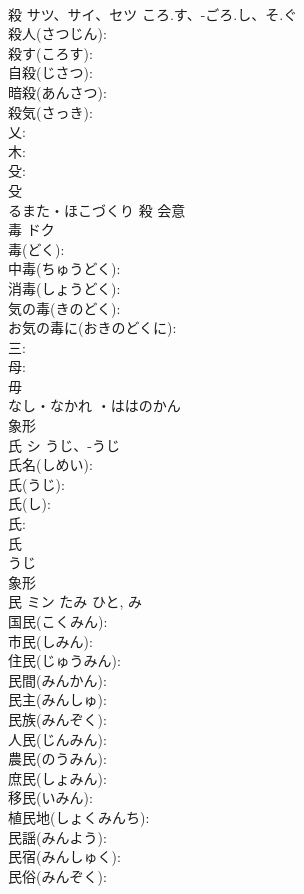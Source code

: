 \documentclass[8pt]{extreport}
\begin{document}
\begin{CJK}{UTF8}{min}
\\	殺	サツ、サイ、セツ	ころ.す、-ごろ.し、そ.ぐ		
\\	殺人(さつじん): 
\\	殺す(ころす): 
\\	自殺(じさつ): 
\\	暗殺(あんさつ): 
\\	殺気(さっき): 
\\	乂: 
\\	木: 
\\	殳: 
\\	殳	
\\	るまた・ほこづくり	殺	会意 
\\	毒	ドク			
\\	毒(どく): 
\\	中毒(ちゅうどく): 
\\	消毒(しょうどく): 
\\	気の毒(きのどく): 
\\	お気の毒に(おきのどくに): 
\\	三: 
\\	母: 
\\	毋	
\\	なし・なかれ ・ははのかん	
\\	象形 
\\	氏	シ	うじ、-うじ		
\\	氏名(しめい): 
\\	氏(うじ): 
\\	氏(し): 
\\	氏: 
\\	氏	
\\	うじ	
\\	象形 
\\	民	ミン	たみ	ひと, み	
\\	国民(こくみん): 
\\	市民(しみん): 
\\	住民(じゅうみん): 
\\	民間(みんかん): 
\\	民主(みんしゅ): 
\\	民族(みんぞく): 
\\	人民(じんみん): 
\\	農民(のうみん): 
\\	庶民(しょみん): 
\\	移民(いみん): 
\\	植民地(しょくみんち): 
\\	民謡(みんよう): 
\\	民宿(みんしゅく): 
\\	民俗(みんぞく): 

\end{CJK}
\end{document}
